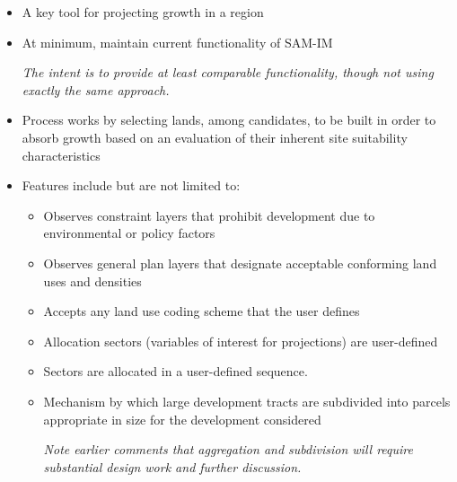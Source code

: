 \begin{itemize}
\item A key tool for projecting growth in a region
\item At minimum, maintain current functionality of SAM-IM

\emph{The intent is to provide at least comparable functionality, though not using exactly the same approach.}

\item Process works by selecting lands, among candidates, to be built in order to absorb growth based on an evaluation of their inherent site suitability characteristics
\item Features include but are not limited to:
\begin{itemize}
\item Observes constraint layers that prohibit development due to environmental or policy factors
\item Observes general plan layers that designate acceptable conforming land uses and densities
\item Accepts any land use coding scheme that the user defines
\item Allocation sectors (variables of interest for projections) are user-defined
\item Sectors are allocated in a user-defined sequence.
\item Mechanism by which large development tracts are subdivided into parcels appropriate in size for the development considered

\emph{Note earlier comments that aggregation and subdivision will require substantial design work and further discussion.}


\end{itemize}
\end{itemize}
